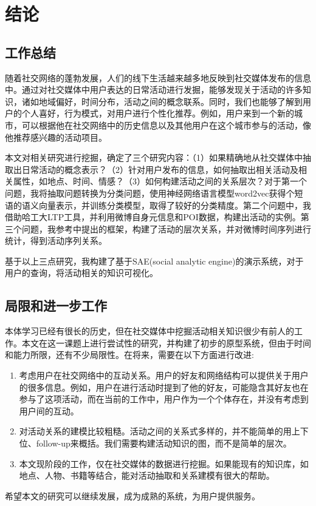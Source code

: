 \chapter{结论}

\section{工作总结}

随着社交网络的蓬勃发展，人们的线下生活越来越多地反映到社交媒体发布的信息中。通过对社交媒体中用户表达的日常活动进行发掘，能够发现关于活动的许多知识，诸如地域偏好，时间分布，活动之间的概念联系。同时，我们也能够了解到用户的个人喜好，行为模式，对用户进行个性化推荐。例如，用户来到一个新的城市，可以根据他在社交网络中的历史信息以及其他用户在这个城市参与的活动，像他推荐感兴趣的活动项目。

本文对相关研究进行挖掘，确定了三个研究内容：（1）如果精确地从社交媒体中抽取出日常活动的概念表示？（2）针对用户发布的信息，如何抽取出相关活动及相关属性，如地点、时间、情感？（3）如何构建活动之间的关系层次？对于第一个问题，我将抽取问题转换为分类问题，使用神经网络语言模型word2vec获得个短语的语义向量表示，并训练分类模型，取得了较好的分类精度。第二个问题中，我借助哈工大LTP工具，并利用微博自身元信息和POI数据，构建出活动的实例。第三个问题，我参考\cite{wang2013phrase}中提出的框架，构建了活动的层次关系，并对微博时间序列进行统计，得到活动序列关系。

基于以上三点研究，我构建了基于SAE(social analytic engine)的演示系统，对于用户的查询，将活动相关的知识可视化。

\section{局限和进一步工作}

本体学习已经有很长的历史，但在社交媒体中挖掘活动相关知识很少有前人的工作。本文在这一课题上进行尝试性的研究，并构建了初步的原型系统，但由于时间和能力所限，还有不少局限性。在将来，需要在以下方面进行改进:
\begin{enumerate}
	\item 考虑用户在社交网络中的互动关系。用户的好友和网络结构可以提供关于用户的很多信息。例如，用户在进行活动时提到了他的好友，可能隐含其好友也在参与了这项活动，而在当前的工作中，用户作为一个个体存在，并没有考虑到用户间的互动。
	\item 对活动关系的建模比较粗糙。活动之间的关系式多样的，并不能简单的用上下位、follow-up来概括。我们需要构建活动知识的图，而不是简单的层次。
	\item 本文现阶段的工作，仅在社交媒体的数据进行挖掘。如果能现有的知识库，如地点、人物、书籍等结合，能对活动抽取和关系建模有很大的帮助。
\end{enumerate}

希望本文的研究可以继续发展，成为成熟的系统，为用户提供服务。